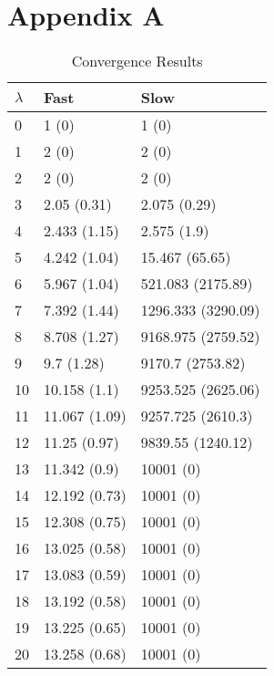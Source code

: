 \chapter{Appendix A}

\begin{table}
    \caption{Convergence Results}
    \label{tbl:convergence}

    \begin{tabularx}{\columnwidth}{lll}
        \toprule
        $\lambda$ & Fast          & Slow               \\
        \midrule
        0         & 1 (0)         & 1 (0)              \\
        1         & 2 (0)         & 2 (0)              \\
        2         & 2 (0)         & 2 (0)              \\
        3         & 2.05 (0.31)   & 2.075 (0.29)       \\
        4         & 2.433 (1.15)  & 2.575 (1.9)        \\
        5         & 4.242 (1.04)  & 15.467 (65.65)     \\
        6         & 5.967 (1.04)  & 521.083 (2175.89)  \\
        7         & 7.392 (1.44)  & 1296.333 (3290.09) \\
        8         & 8.708 (1.27)  & 9168.975 (2759.52) \\
        9         & 9.7 (1.28)    & 9170.7 (2753.82)   \\
        10        & 10.158 (1.1)  & 9253.525 (2625.06) \\
        11        & 11.067 (1.09) & 9257.725 (2610.3)  \\
        12        & 11.25 (0.97)  & 9839.55 (1240.12)  \\
        13        & 11.342 (0.9)  & 10001 (0)          \\
        14        & 12.192 (0.73) & 10001 (0)          \\
        15        & 12.308 (0.75) & 10001 (0)          \\
        16        & 13.025 (0.58) & 10001 (0)          \\
        17        & 13.083 (0.59) & 10001 (0)          \\
        18        & 13.192 (0.58) & 10001 (0)          \\
        19        & 13.225 (0.65) & 10001 (0)          \\
        20        & 13.258 (0.68) & 10001 (0)          \\

\end{tabularx}
\end{table}
